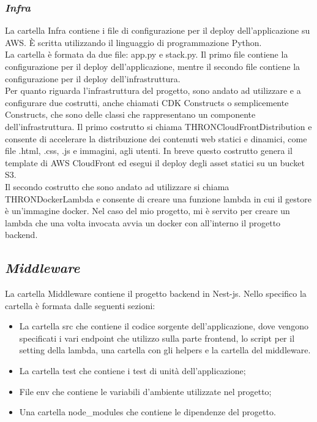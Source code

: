 \subsubsection*{\emph{Infra}}
La cartella Infra contiene i file di configurazione per il deploy dell'applicazione su AWS. È scritta utilizzando il linguaggio di programmazione Python.\\
La cartella è formata da due file: app.py e stack.py. Il primo file contiene la configurazione per il deploy dell'applicazione, mentre il secondo file contiene la configurazione per il deploy dell'infrastruttura.\\
Per quanto riguarda l'infrastruttura del progetto, sono andato ad utilizzare e a configurare due costrutti, anche chiamati CDK Constructs o semplicemente Constructs, che sono delle classi che rappresentano un componente dell'infrastruttura.
Il primo costrutto si chiama THRONCloudFrontDistribution e consente di accelerare la distribuzione dei contenuti web statici e dinamici, come file .html, .css, .js e immagini, agli utenti.
In breve questo costrutto genera il template di AWS CloudFront ed esegui il deploy degli asset statici su un bucket S3.\\
Il secondo costrutto che sono andato ad utilizzare si chiama THRONDockerLambda e consente di creare una funzione lambda in cui il gestore è un'immagine docker.
Nel caso del mio progetto, mi è servito per creare un lambda che una volta invocata avvia un docker con all'interno il progetto backend.\\

\subsection*{\emph{Middleware}}
La cartella Middleware contiene il progetto backend in Nest-js. Nello specifico la cartella è formata dalle seguenti sezioni:
\begin{itemize}
  \item La cartella src che contiene il codice sorgente dell'applicazione, dove vengono specificati i vari endpoint che utilizzo sulla parte frontend, lo script per il setting
  della lambda, una cartella con gli helpers e la cartella del middleware.
  \item La cartella test che contiene i test di unità dell'applicazione;
  \item File env che contiene le variabili d'ambiente utilizzate nel progetto;
  \item Una cartella node\_modules che contiene le dipendenze del progetto.
\end{itemize}
